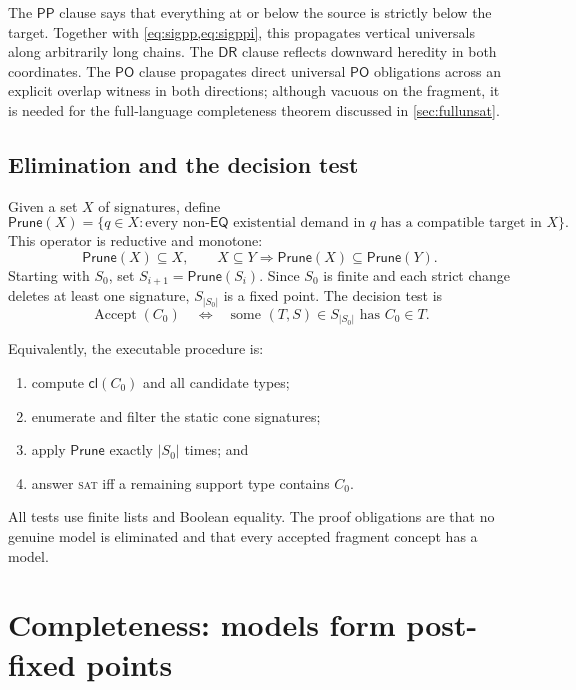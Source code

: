 \documentclass[11pt]{article}
\theoremstyle{plain}
\theoremstyle{definition}
\theoremstyle{remark}
\newcommand{\EQ}{\ensuremath{\mathsf{EQ}}}
\newcommand{\PP}{\ensuremath{\mathsf{PP}}}
\newcommand{\PO}{\ensuremath{\mathsf{PO}}}
\newcommand{\DR}{\ensuremath{\mathsf{DR}}}
\newcommand{\cl}{\ensuremath{\mathsf{cl}}}
\newcommand{\Prune}{\ensuremath{\mathsf{Prune}}}
\begin{document}
The $\PP$ clause says that everything at or below the source is strictly below
the target.  Together with \cref{eq:sigpp,eq:sigppi}, this propagates vertical
universals along arbitrarily long chains.  The $\DR$ clause reflects downward
heredity in both coordinates.  The $\PO$ clause propagates direct universal
$\PO$ obligations across an explicit overlap witness in both directions;
although vacuous on the fragment, it is needed for the full-language
completeness theorem discussed in \cref{sec:fullunsat}.

\subsection{Elimination and the decision test}

Given a set $X$ of signatures, define
\[
 \Prune(X)=\bigl\{q\in X :
   \text{every non-$\EQ$ existential demand in $q$ has a compatible target
   in $X$}\bigr\}.
\]
This operator is reductive and monotone:
\[
  \Prune(X)\subseteq X,
  \qquad X\subseteq Y\Longrightarrow\Prune(X)\subseteq\Prune(Y).
\]
Starting with $S_0$, set $S_{i+1}=\Prune(S_i)$.  Since $S_0$ is finite and
each strict change deletes at least one signature, $S_{|S_0|}$ is a fixed
point.  The decision test is
\begin{equation}
  \operatorname{Accept}(C_0)
  \quad\Longleftrightarrow\quad
  \text{some }(T,S)\in S_{|S_0|}\text{ has }C_0\in T.
  \label{eq:accept}
\end{equation}

Equivalently, the executable procedure is:
\begin{enumerate}
  \item compute $\cl(C_0)$ and all candidate types;
  \item enumerate and filter the static cone signatures;
  \item apply $\Prune$ exactly $|S_0|$ times; and
  \item answer \textsc{sat} iff a remaining support type contains $C_0$.
\end{enumerate}
All tests use finite lists and Boolean equality.  The proof obligations are
that no genuine model is eliminated and that every accepted fragment concept
has a model.

\section{Completeness: models form post-fixed points}
\label{sec:completeness}
\end{document}

